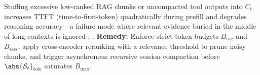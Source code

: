 \documentclass[../../../../master.tex]{subfiles}
\begin{document}
\begin{pitfall}
Stuffing excessive low-ranked RAG chunks or uncompacted tool outputs into $C_t$ increases TTFT (time-to-first-token) quadratically during prefill and degrades reasoning accuracy---a failure mode where relevant evidence buried in the middle of long contexts is ignored ; .
\textbf{Remedy:} Enforce strict token budgets $B_{\mathrm{rag}}$ and $B_{\mathrm{sess}}$, apply cross-encoder reranking with a relevance threshold to prune noisy chunks, and trigger asynchronous recursive session compaction before $\abs{\mathcal{S}_t}_{\mathrm{tok}}$ saturates $B_{\max}$.
\end{pitfall}
\end{document}
